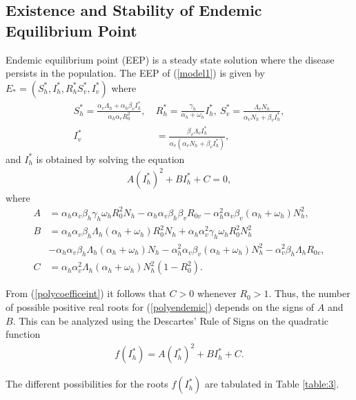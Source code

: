 \documentclass[review]{elsarticle}
\begin{document}
\subsection{Existence and Stability of Endemic Equilibrium Point}

Endemic equilibrium point (EEP) is a steady state solution where the disease persists in the population. The EEP of (\ref{model1}) is given by $E_*=(S_h^*,I_h^*,R_h^*S_v^*,I_v^*)$ where
\begin{align*}
S_h^*=\frac{\alpha_v\Lambda_h+\alpha_h\beta_vI_h^*}{\alpha_h\alpha_vR_0^2},\ &
R_h^*=\frac{\gamma_h}{\alpha_h+\omega_h}I_h^*,\
S_v^*=\frac{\Lambda_v N_h}{\alpha_vN_h+\beta_vI_h^*},\\
I_v^*&=\frac{\beta_v\Lambda_vI_h^*}{\alpha_v(\alpha_vN_h+\beta_vI_h^*)},
\end{align*}
and $I_h^*$ is obtained by solving the equation
\begin{align}\label{polyendemic}
A(I_h^*)^2+BI_h^*+C=0,
\end{align}
where
\begin{equation}\label{polycoefficeint}
\begin{aligned}
A&=\alpha_h\alpha_v\beta_h\gamma_h\omega_hR_0^2N_h-\alpha_h\alpha_v\beta_h\beta_vR_{0v}
-\alpha_h^2\alpha_v\beta_v(\alpha_h+\omega_h)N_h^2,\\
B&=\alpha_h\alpha_v\beta_h\Lambda_h(\alpha_h+\omega_h)R_0^2N_h+\alpha_h\alpha_v^2\gamma_h\omega_hR_0^2N_h^2\\
&-\alpha_h\alpha_v\beta_h\Lambda_h(\alpha_h+\omega_h)N_h -\alpha_h^2\alpha_v\beta_v(\alpha_h+\omega_h)N_h^2
-\alpha_v^2\beta_h\Lambda_hR_{0v},\\
C&=\alpha_h\alpha_v^2\Lambda_h(\alpha_h+\omega_h)N_h^2\left(1-R_0^2\right).
\end{aligned}
\end{equation}

From (\ref{polycoefficeint}) it follows that $C>0$ whenever $R_0>1$. Thus, the number of possible positive real roots for (\ref{polyendemic}) depends on the signs of $A$ and $B$. This can be analyzed using the Descartes' Rule of Signs on the quadratic function
\begin{align*}
f(I_h^*)=A(I_h^*)^2+BI_h^*+C.
\end{align*}

The different possibilities for the roots $f(I_h^*)$ are tabulated in Table \ref{table:3}.
\end{document}
